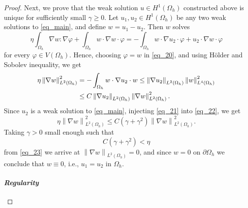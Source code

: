 \documentclass[11pt,a4paper]{amsart}
\theoremstyle{remark}
\theoremstyle{definition}
\numberwithin{equation}{section}
\numberwithin{proposition}{section}
\begin{document}
\begin{proof}
Next, we prove that the weak solution $u\in H^1(\Omega_h)$ constructed above is unique for sufficiently small $\gamma\ge0$. Let $u_1,u_2\in H^1(\Omega_h)$ be any two weak solutions to \eqref{eq_main}, and define $w=u_1-u_2$.
Then $w$ solves
\begin{equation}\label{eq_20}
\eta\int_{\Omega_h}\nabla w:\nabla\varphi+\int_{\Omega_h}w\cdot\nabla w\cdot\varphi=-\int_{\Omega_h}w\cdot\nabla u_2\cdot\varphi+u_2\cdot\nabla w\cdot\varphi
\end{equation}
for every $\varphi\in V(\Omega_h)$. Hence, choosing $\varphi=w$ in \eqref{eq_20}, and using H\"older and Sobolev inequality, we get
\begin{align}\label{eq_22}
\eta\left\|\nabla w\right\|_{L^2(\Omega_h)}^2&=-\int_{\Omega_h}w\cdot\nabla u_2\cdot w\le\left\|\nabla u_2\right\|_{L^2(\Omega_h)}\left\|w\right\|_{L^4(\Omega_h)}^2 \notag\\
&\le C\left\|\nabla u_2\right\|_{L^2(\Omega_h)}\left\|\nabla w\right\|_{L^2(\Omega_h)}^2.
\end{align}
Since $u_2$ is a weak solution to \eqref{eq_main}, injecting \eqref{eq_21} into \eqref{eq_22}, we get
\begin{equation}\label{eq_23}
\eta\left\|\nabla w\right\|_{L^2(\Omega_h)}^2\le C\left(\gamma+\gamma^2\right)\left\|\nabla w\right\|_{L^2(\Omega_h)}^2.
\end{equation}
Taking $\gamma>0$ small enough such that
\begin{equation*}
C\left(\gamma+\gamma^2\right)<\eta
\end{equation*}
from \eqref{eq_23} we arrive at $\left\|\nabla w\right\|_{L^2(\Omega_h)}=0$, and since $w=0$ on $\partial\Omega_h$ we conclude that $w\equiv0$, i.e., $u_1=u_2$ in $\Omega_h$.





\paragraph{\emph{Regularity}}


\end{proof}
\end{document}
